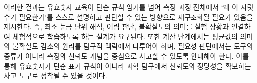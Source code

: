 이러한 결과는 유효숫자 교육이 단순 규칙 암기를 넘어 측정 과정 전체에서
`왜 이 자릿수가 필요한가'를 스스로 설명하고 판단할 수 있는 방향으로
재구조화될 필요가 있음을 제시한다.
%
즉, 최소 눈금 단위 해석, 어림 판단, 불확실도의 의미를 실험 상황과 연결하여
체험적으로 학습하도록 하는 설계가 요구된다.
%
또한 계산 단계에서는 평균값의 의미와 불확실도 감소의 원리를 탐구적 맥락에서 다루어야 하며,
필요성 판단에서는 도구의 종류가 아니라 측정의 신뢰도 개념을 중심으로 사고할 수 있도록 안내해야 한다.
%
이를 통해 유효숫자가 단순 표기 규칙이 아니라 과학 탐구에서 신뢰도와 정당성을 확보하는
사고 도구로 정착될 수 있을 것이다.


